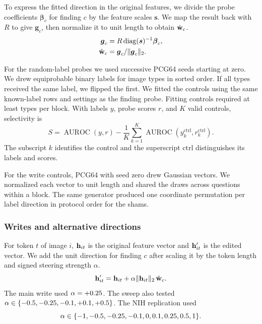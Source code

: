 To express the fitted direction in the original features, we divide the probe coefficients $\boldsymbol\beta_c$ for finding $c$ by the feature scales $\boldsymbol s$. We map the result back with $R$ to give $\boldsymbol g_c$, then normalize it to unit length to obtain $\hat{\mathbf{w}}_c$.
\begin{equation}
\begin{aligned}
\boldsymbol g_c &= R\,\mathrm{diag}(\boldsymbol s)^{-1}\boldsymbol\beta_c,\\
\hat{\mathbf{w}}_c &= \boldsymbol g_c/\lVert\boldsymbol g_c\rVert_2.
\end{aligned}
\label{eq:lift}
\end{equation}

For the \jnLabelControlCount{} random-label probes we used successive PCG64 seeds starting at zero. We drew equiprobable binary labels for image types in sorted order. If all types received the same label, we flipped the first. We fitted the controls using the same known-label rows and settings as the finding probe. Fitting controls required at least \jnMinControlTypes{} types per block. With labels $y$, probe scores $r$, and $K$ valid controls, selectivity is
\begin{equation}
S=\operatorname{AUROC}(y,r)-
\frac{1}{K}\sum_{k=1}^{K}\operatorname{AUROC}
             (y_k^{\mathrm{ctrl}},r_k^{\mathrm{ctrl}}).
\label{eq:selectivity}
\end{equation}
The subscript $k$ identifies the control and the superscript $\mathrm{ctrl}$ distinguishes its labels and scores.

For the write controls, PCG64 with seed zero drew Gaussian vectors. We normalized each vector to unit length and shared the draws across questions within a block. The same generator produced one coordinate permutation per label direction in protocol order for the shams.

\subsubsection{Writes and alternative directions}
\label{sec:write-implementation}

For token $t$ of image $i$, $\mathbf{h}_{it}$ is the original feature vector and $\mathbf{h}'_{it}$ is the edited vector. We add the unit direction for finding $c$ after scaling it by the token length and signed steering strength $\alpha$.
\begin{equation}
\mathbf{h}'_{it}=\mathbf{h}_{it}+\alpha\lVert\mathbf{h}_{it}\rVert_2\,\hat{\mathbf{w}}_c.
\label{eq:intervention}
\end{equation}
The main write used $\alpha=+0.25$. The sweep also tested $\alpha\in\{-0.5,-0.25,-0.1,+0.1,+0.5\}$. The NIH replication used
\[\alpha\in\{-1,-0.5,-0.25,-0.1,0,0.1,0.25,0.5,1\}.\]

